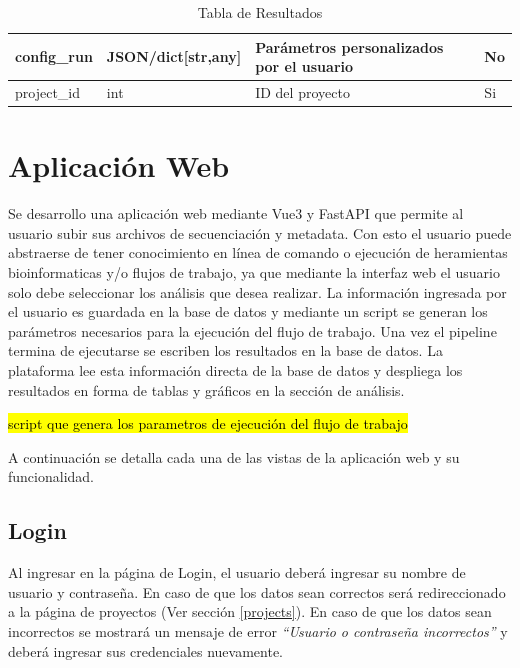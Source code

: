 \begin{itemize}
\begin{table}[H]
\begin{tabular}{|l|l|l|l|}
    config\_run            & JSON/dict{[}str,any{]} & Parámetros personalizados por el usuario                                                                                                                 & No \\ \hline
    project\_id            & int                    & ID del proyecto                                                                                                                                          & Si \\ \hline
    \end{tabular}
    \caption{Tabla de Resultados}
    \label{tab:db-results}
    \end{table}

\newpage
\section{Aplicación Web}
Se desarrollo una aplicación web mediante Vue3 y FastAPI que permite al usuario subir sus archivos de secuenciación y metadata. 
Con esto el usuario puede abstraerse de tener conocimiento en línea de comando o ejecución de heramientas bioinformaticas y/o flujos de trabajo, 
ya que mediante la interfaz web el usuario solo debe seleccionar los análisis que desea realizar.
La información ingresada por el usuario es guardada en la base de datos y mediante un script se generan los parámetros necesarios para la ejecución del flujo de trabajo.
Una vez el pipeline termina de ejecutarse se escriben los resultados en la base de datos. 
La plataforma lee esta información directa de la base de datos y despliega los resultados en forma de tablas y gráficos en la sección de análisis.

\hl{script que genera los parametros de ejecución del flujo de trabajo} 

A continuación se detalla cada una de las vistas de la aplicación web y su funcionalidad.

\subsection{Login}
Al ingresar en la página de Login, el usuario deberá ingresar su nombre de usuario y contraseña.
En caso de que los datos sean correctos será redireccionado a la página de proyectos (Ver sección \ref{projects}).
En caso de que los datos sean incorrectos se mostrará un mensaje de error \textit{“Usuario o contraseña incorrectos”} y deberá ingresar sus credenciales nuevamente.



\end{itemize}
